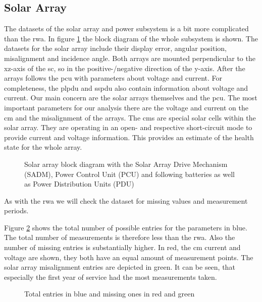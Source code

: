 \subsection{Solar Array}
The datasets of the solar array and power subsystem is a bit more complicated than the \ac{rwa}. In figure \ref{f:solar_array_block} the block diagram of the whole subsystem is shown. The datasets for the solar array include their display error, angular position, misalignment and incidence angle. Both arrays are mounted perpendicular to the xz-axis of the \ac{sc}, so in the positive-/negative direction of the y-axis. After the arrays follows the \ac{pcu} with parameters about voltage and current. For completeness, the \ac{plpdu} and \ac{sspdu} also contain information about voltage and current. \newline
Our main concern are the solar arrays themselves and the \ac{pcu}. The most important parameters for our analysis there are the voltage and current on the \ac{cm} and the misalignment of the arrays. The \acp{cm} are special solar cells within the solar array. They are operating in an open- and respective short-circuit mode to provide current and voltage information. This provides an estimate of the health state for the whole array. 

\begin{figure}[htb]
\centering

\caption{Solar array block diagram with the Solar Array Drive Mechanism (SADM), Power Control Unit (PCU) and following batteries as well as Power Distribution Units (PDU)}
\label{f:solar_array_block}
\end{figure}

As with the \ac{rwa} we will check the dataset for missing values and measurement periods.

Figure \ref{f:solar_missing_chart} shows the total number of possible entries for the parameters in blue. The total number of measurements is therefore less than the \ac{rwa}. Also the number of missing entries is substantially higher. In red, the \ac{cm} current and voltage are shown, they both have an equal amount of measurement points. The solar array misalignment entries are depicted in green. It can be seen, that especially the first year of service had the most measurements taken.

\begin{figure}[htb]
\centering

\caption{Total entries in blue and missing ones in red and green}
\label{f:solar_missing_chart}
\end{figure}

